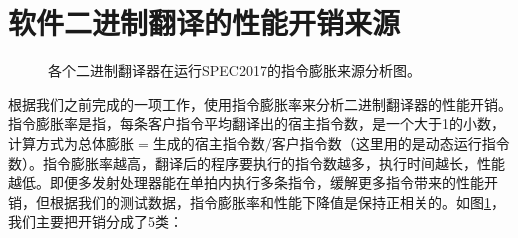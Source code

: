 \section{软件二进制翻译的性能开销来源}

\begin{figure}[h]
  \centering
  \caption{各个二进制翻译器在运行SPEC2017的指令膨胀来源分析图。}
  \label{img:insts_inflt_breakdown_2017}
\end{figure}

根据我们之前完成的一项工作，使用指令膨胀率来分析二进制翻译器的性能开销。指令膨胀率是指，每条客户指令平均翻译出的宿主指令数，是一个大于1的小数，计算方式为$\mbox{总体膨胀} = \mbox{生成的宿主指令数} / \mbox{客户指令数}$（这里用的是动态运行指令数）。指令膨胀率越高，翻译后的程序要执行的指令数越多，执行时间越长，性能越低。即便多发射处理器能在单拍内执行多条指令，缓解更多指令带来的性能开销，但根据我们的测试数据，指令膨胀率和性能下降值是保持正相关的。如图\ref{img:insts_inflt_breakdown_2017}，我们主要把开销分成了5类：

